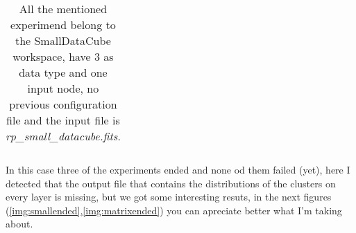 \documentclass[11pt,fleqn]{book} %
\begin{document}
\begin{table}[h!]
\begin{tabular}{ c c c c c c }
																																																																																																																																																																																																																																																																																									          \hline
																																																																																																																																																																																																																																																																																										    \end{tabular}
																																																																																																																																																																																																																																																																																										      \caption{All the mentioned experimend belong to the SmallDataCube workspace, have 3 as data type and one input node, no previous configuration file and the input file is \emph{rp\_small\_datacube.fits}.}
																																																																																																																																																																																																																																																																																										        \label{tab:small}
																																																																																																																																																																																																																																																																																											\end{table}
																																																																																																																																																																																																																																																																																											In this case three of the experiments ended and none od them failed (yet), here I detected that the output file that contains the distributions of the clusters on every layer is missing, but we got some interesting resuts, in the next figures (\ref{img:smallended},\ref{img:matrixended}) you can apreciate better what I'm taking about.
\end{document}
